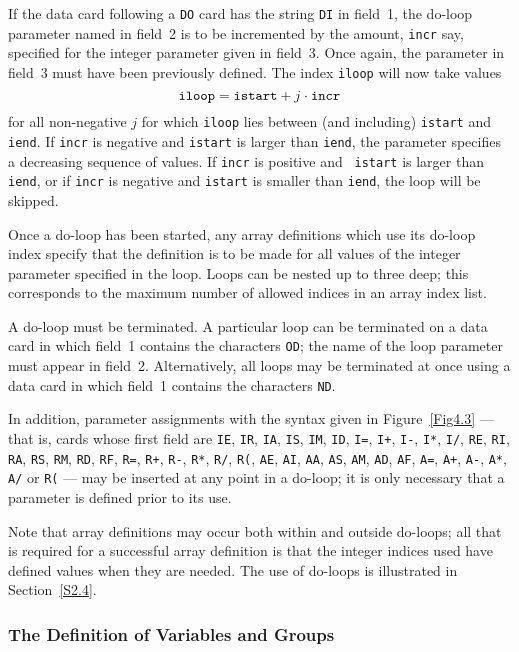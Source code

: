 \documentclass[a4paper]{article}
\newcommand{\bdmath}{\begin{displaymath}}
\newcommand{\edmath}{\end{displaymath}}
\begin{document}
If the data card
following a {\tt DO}
card has the string  {\tt DI}
in field~1,   the  do-loop parameter
named    in   field~2 is    to be
incremented
by the amount,  {\tt incr} say,  specified for the integer
parameter given in field~3.  Once again, the parameter in field~3 must
have been previously  defined.  The  index {\tt  iloop} will now  take
values
\bdmath
{\tt iloop} = {\tt istart}  + j \cdot {\tt incr}
\edmath
for all non-negative $j$  for which  {\tt   iloop}  lies   between  (and
including) {\tt istart} and {\tt iend}.  If {\tt incr} is negative and
{\tt istart}  is  larger than  {\tt  iend},  the parameter specifies a
decreasing sequence of  values.   If {\tt incr}  is positive  and {\tt
istart} is larger  than {\tt iend},  or  if {\tt incr} is negative and
{\tt istart} is smaller than {\tt iend}, the loop will be skipped.

Once a do-loop has been  started, any array
definitions  which use its
do-loop index specify that the definition is to be made for all values
of the integer parameter
specified in  the loop.   Loops can be nested
up to three deep;  this corresponds to the  maximum number  of allowed
indices in an array
index list.

A do-loop must be terminated. A particular loop can be terminated on a
data card
in which field~1 contains the characters  {\tt OD};
the name of the loop
parameter must appear in field~2. Alternatively, all loops
may be terminated at once using a data  card in which field~1 contains
the characters {\tt ND}.

In   addition, parameter     assignments with the   syntax  given   in
Figure~\ref{Fig4.3} --- that is, cards  whose first  field are {\tt IE},
{\tt IR}, {\tt IA}, {\tt IS}, {\tt IM}, {\tt ID},  {\tt I=}, {\tt I+},
{\tt I-}, {\tt I*}, {\tt I/}, {\tt RE}, {\tt RI},  {\tt RA}, {\tt RS},
{\tt RM}, {\tt RD}, {\tt RF}, {\tt R=}, {\tt R+}, {\tt  R-}, {\tt R*},
{\tt R/}, {\tt R(}, {\tt AE}, {\tt AI},  {\tt AA}, {\tt AS}, {\tt AM},
{\tt AD}, {\tt AF}, {\tt A=},  {\tt A+}, {\tt  A-}, {\tt A*}, {\tt A/}
or {\tt R(} --- may be inserted at any point in a  do-loop; it is only
necessary that a parameter is defined prior to its use.

Note   that  array
definitions  may  occur  both  within  and  outside
do-loops; all that is required  for  a  successful array definition is
that  the  integer indices   used have   defined values  when they are
needed.  The use of do-loops is illustrated in Section~\ref{S2.4}.

\subsubsection{\label{S2.2.5}The Definition of Variables and Groups}
\end{document}
